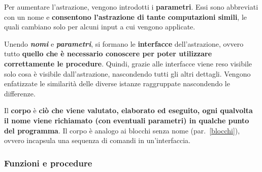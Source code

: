 \documentclass[a4paper]{article}
\begin{document}
 	\noindent
 	Per aumentare l'astrazione, vengono introdotti i \textcolor{Red3}{\textbf{parametri}}. Essi sono abbreviati con un nome e \textbf{consentono l'astrazione di tante computazioni simili}, le quali cambiano solo per alcuni input a cui vengono applicate.\newline
 	
 	\noindent
 	Unendo \emph{\textbf{nomi}} e \emph{\textbf{parametri}}, si formano le \textcolor{Red3}{\textbf{interfacce}} dell'astrazione, ovvero tutto \textbf{quello che è necessario conoscere per poter utilizzare correttamente le procedure}. Quindi, grazie alle interfacce viene reso visibile solo cosa è visibile dall'astrazione, nascondendo tutti gli altri dettagli. Vengono enfatizzate le similarità delle diverse istanze raggruppate nascondendo le differenze.\newline
 	
 	\noindent
 	Il \textcolor{Red3}{\textbf{corpo}} è \textbf{ciò che viene valutato, elaborato ed eseguito, ogni qualvolta il nome viene richiamato (con eventuali parametri) in qualche punto del programma}. Il corpo è analogo ai blocchi senza nome (par.~\ref{blocchi}), ovvero incapsula una sequenza di comandi in un'interfaccia.\newpage
 	
 	\subsubsection{Funzioni e procedure}
 	
\end{document}
